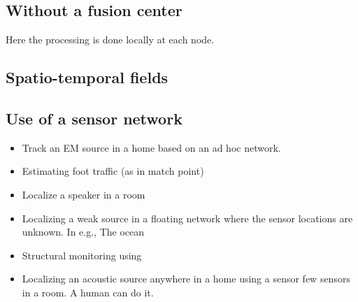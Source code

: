 \documentclass{article}
\begin{document}
\subsection{Without a fusion center}
Here the processing is done locally at each node.

\subsection{Spatio-temporal fields}

\subsection{Use of a sensor network}
\begin{itemize}
\item Track an EM source in a home based on an ad hoc network. 
\item Estimating foot traffic (as in match point)
\item Localize a speaker in a room
\item Localizing a weak source in a floating network where the sensor locations are unknown. In e.g., The ocean
\item Structural monitoring using 
\item Localizing an acoustic source anywhere in a home using a sensor few sensors in a room. A human can do it. 
\end{itemize}
\end{document}
